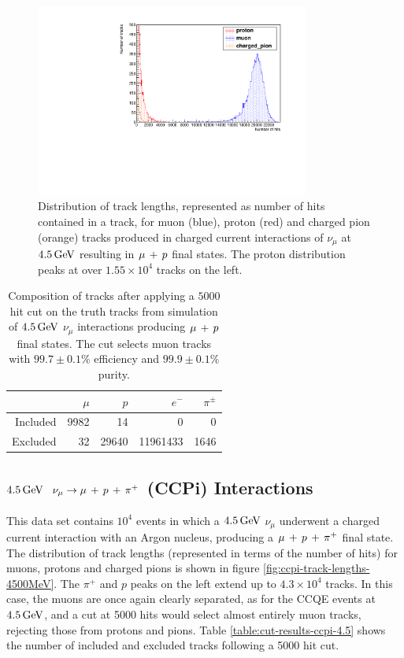 \begin{figure}
\centering
\includegraphics[angle=-90,width=0.8\textwidth]{chapters/particleid_images/ccqe-4500-track-lengths}
\caption[Track length distributions for $\mu$, $p$ and $\pi^+$ from $4.5\GeV$ neutrinos (CCQE)]{\label{fig:ccqe-track-lengths-4500MeV}Distribution of track lengths, represented as number of hits contained in a track, for muon (blue), proton (red) and charged pion (orange) tracks produced in charged current interactions of $\nu_\mu$ at $4.5\GeV$ resulting in $\mu\,+\,p$ final states. The proton distribution peaks at over $1.55\times10^4$ tracks on the left.}
\end{figure}

\begin{table}
\centering
\begin{tabular}{*{5}{r}}
 & $\mu$ & $p$ & $e^-$ & $\pi^\pm$ \\
\hline
\hline
Included & 9982 & 14 & 0 & 0 \\
Excluded & 32 & 29640 & 11961433 & 1646 \\
\hline
\end{tabular}
\caption[Composition of tracks after $5000$ hit cut on $4.5\GeV$ CCQE events]{\label{table:cut-results-ccqe-4.5}Composition of tracks after applying a $5000$ hit cut on the truth tracks from simulation of $4.5\GeV$ $\nu_\mu$ interactions producing $\mu\,+\,p$ final states. The cut selects muon tracks with $99.7\pm0.1\%$ efficiency and $99.9\pm0.1\%$ purity.}
\end{table}

\subsection{$4.5\GeV$ $\nu_\mu \rightarrow \mu\,+\,p\,+\,\pi^{+}$ (\acs{CCPi}) Interactions}
This data set contains $10^4$ events in which a $4.5\GeV$ $\nu_\mu$ underwent a charged current interaction with an Argon nucleus, producing a $\mu\,+\,p\,+\,\pi^{+}$ final state. The distribution of track lengths (represented in terms of the number of hits) for muons, protons and charged pions is shown in figure \ref{fig:ccpi-track-lengths-4500MeV}. The $\pi^+$ and $p$ peaks on the left extend up to $4.3\times10^4$ tracks. In this case, the muons are once again clearly separated, as for the CCQE events at $4.5\GeV$, and a cut at 5000 hits would select almost entirely muon tracks, rejecting those from protons and pions. Table \ref{table:cut-results-ccpi-4.5} shows the number of included and excluded tracks following a 5000 hit cut.

